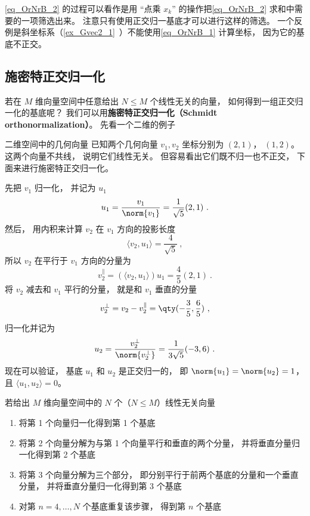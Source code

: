 \autoref{eq_OrNrB_2} 的过程可以看作是用 “点乘 $ x_k$” 的操作把\autoref{eq_OrNrB_2} 求和中需要的一项筛选出来。 注意只有使用正交归一基底才可以进行这样的筛选。 一个反例是斜坐标系（\autoref{ex_Gvec2_1}~）不能使用\autoref{eq_OrNrB_1} 计算坐标， 因为它的基底不正交。


\subsection{施密特正交归一化}\label{sub_OrNrB_1}


若在 $M$ 维向量空间中任意给出 $N \leqslant M$ 个线性无关的向量， 如何得到一组正交归一化的基底呢？ 我们可以用\textbf{施密特正交归一化（Schmidt orthonormalization）}。 先看一个二维的例子

\begin{example}{二维空间中的几何向量}
已知两个几何向量 $v_1, v_2$ 坐标分别为 $(2, 1)$， $(1, 2)$。 这两个向量不共线， 说明它们线性无关。 但容易看出它们既不归一也不正交， 下面来进行施密特正交归一化。

先把 $v_1$ 归一化， 并记为 $u_1$
\begin{equation}
u_1 = \frac{v_1}{\norm{v_1}} = \frac{1}{\sqrt{5}} (2, 1)~.
\end{equation}
然后， 用内积来计算 $v_2$ 在 $v_1$ 方向的投影长度
\begin{equation}
\langle v_2, u_1 \rangle = \frac{4}{\sqrt{5}}~,
\end{equation}
所以 $v_2$ 在平行于 $v_1$ 方向的分量为
\begin{equation}
v_2^\parallel = (\langle v_2, u_1 \rangle)u_1 = \frac{4}{5} (2, 1)~.
\end{equation}
将 $v_2$ 减去和 $v_1$ 平行的分量， 就是和 $v_1$ 垂直的分量
\begin{equation}
v_2^\bot = v_2 - v_2^\parallel = \qty(-\frac35, \frac65)~,
\end{equation}
归一化并记为
\begin{equation}
u_2 = \frac{v_2^\bot}{\norm{v_2^\bot}} = \frac{1}{3\sqrt{5}} (-3, 6)~.
\end{equation}
现在可以验证， 基底 $u_1$ 和 $u_2$ 是正交归一的， 即 $\norm{u_1} = \norm{u_2} = 1$， 且 $\langle u_1, u_2 \rangle = 0$。
\end{example}

若给出 $M$ 维向量空间中的 $N$ 个（$N \leqslant M$）线性无关向量
\begin{enumerate}
\item 将第 1 个向量归一化得到第 1 个基底
\item 将第 2 个向量分解为与第 1 个向量平行和垂直的两个分量， 并将垂直分量归一化得到第 2 个基底
\item 将第 3 个向量分解为三个部分， 即分别平行于前两个基底的分量和一个垂直分量， 并将垂直分量归一化得到第 3 个基底
\item 对第 $n = 4, \dots , N$ 个基底重复该步骤， 得到第 $n$ 个基底
\end{enumerate}


